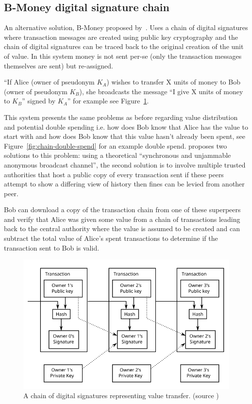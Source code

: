 \subsection{B-Money digital signature chain}\label{digital-sig}
An alternative solution, B-Money proposed by~\textcite{b-money}. Uses a chain of digital signatures where transaction messages are created using public key cryptography and the chain of digital signatures can be traced back to the original creation of the unit of value. In this system money is not sent per-se (only the transaction messages themselves are sent) but re-assigned.

``If Alice (owner of pseudonym $K_A$) wishes to transfer X units of money to Bob (owner of pseudonym $K_B$), she broadcasts the message ``I give X units of money to $K_B$'' signed by $K_A$'' for example see Figure~\ref{fig:chain-spend}.

This system presents the same problems as before regarding value distribution and potential double spending i.e. how does Bob know that Alice has the value to start with and how does Bob know that this value hasn't already been spent, see Figure~\ref{fig:chain-double-spend} for an example double spend. \textcite{b-money} proposes two solutions to this problem: using a theoretical ``synchronous and unjammable anonymous broadcast channel'', the second solution is to involve multiple trusted authorities that host a public copy of every transaction sent if these peers attempt to show a differing view of history then fines can be levied from another peer.

Bob can download a copy of the transaction chain from one of these superpeers and verify that Alice was given some value from a chain of transactions leading back to the central authority where the value is assumed to be created and can subtract the total value of  Alice's spent transactions to determine if the transaction sent to Bob is valid. 
\begin{figure}[t!]
    \centering
    \includegraphics[width=\columnwidth]{img/Bitcoin_Transaction_Visual}
    \caption{A chain of digital signatures representing value transfer.
    (source \protect\cite{satoshi})}
    \label{fig:chain-spend}
\end{figure}

